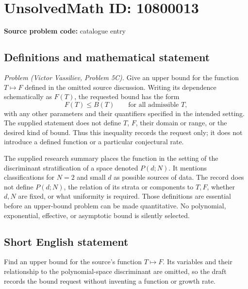 \documentclass[11pt]{article}
\begin{document}
\section*{UnsolvedMath ID: 10800013}
\textbf{Source problem code:} catalogue entry
\subsection{Definitions and mathematical statement}
\emph{Problem (Victor Vassiliev, Problem 5C).} Give an upper bound for the function \(T\mapsto F\) defined in the omitted source discussion. Writing its dependence schematically as \(F(T)\), the requested bound has the form
\[
 F(T)\leq B(T)\qquad\text{for all admissible }T,
\]
with any other parameters and their quantifiers specified in the intended setting. The supplied statement does not define \(T\), \(F\), their domain or range, or the desired kind of bound. Thus this inequality records the request only; it does not introduce a defined function or a particular conjectural rate.

The supplied research summary places the function in the setting of the discriminant stratification of a space denoted \(P(d;N)\). It mentions classifications for \(N=2\) and small \(d\) as possible sources of data. The record does not define \(P(d;N)\), the relation of its strata or components to \(T,F\), whether \(d,N\) are fixed, or what uniformity is required. Those definitions are essential before an upper-bound problem can be made quantitative. No polynomial, exponential, effective, or asymptotic bound is silently selected.
\subsection{Short English statement}
Find an upper bound for the source's function \(T\mapsto F\). Its variables and their relationship to the polynomial-space discriminant are omitted, so the draft records the bound request without inventing a function or growth rate.
\end{document}
